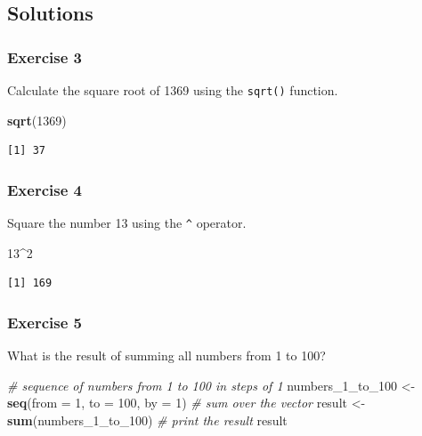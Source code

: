 \documentclass[]{article}
\newenvironment{Shaded}{\begin{snugshade}}{\end{snugshade}}
\newcommand{\KeywordTok}[1]{\textcolor[rgb]{0.13,0.29,0.53}{\textbf{#1}}}
\newcommand{\DataTypeTok}[1]{\textcolor[rgb]{0.13,0.29,0.53}{#1}}
\newcommand{\DecValTok}[1]{\textcolor[rgb]{0.00,0.00,0.81}{#1}}
\newcommand{\StringTok}[1]{\textcolor[rgb]{0.31,0.60,0.02}{#1}}
\newcommand{\CommentTok}[1]{\textcolor[rgb]{0.56,0.35,0.01}{\textit{#1}}}
\newcommand{\OperatorTok}[1]{\textcolor[rgb]{0.81,0.36,0.00}{\textbf{#1}}}
\newcommand{\NormalTok}[1]{#1}
\theoremstyle{definition}
\theoremstyle{definition}
\theoremstyle{definition}
\theoremstyle{remark}
\begin{document}
\subsection{Solutions}\label{solutions}

\subsubsection{Exercise 3}\label{exercise-3}

Calculate the square root of 1369 using the \texttt{sqrt()} function.

\begin{Shaded}
\begin{Highlighting}[]
\KeywordTok{sqrt}\NormalTok{(}\DecValTok{1369}\NormalTok{)}
\end{Highlighting}
\end{Shaded}

\begin{verbatim}
[1] 37
\end{verbatim}

\subsubsection{Exercise 4}\label{exercise-4}

Square the number 13 using the \texttt{\^{}} operator.

\begin{Shaded}
\begin{Highlighting}[]
\DecValTok{13}\OperatorTok{^}\DecValTok{2}
\end{Highlighting}
\end{Shaded}

\begin{verbatim}
[1] 169
\end{verbatim}

\subsubsection{Exercise 5}\label{exercise-5}

What is the result of summing all numbers from 1 to 100?

\begin{Shaded}
\begin{Highlighting}[]
\CommentTok{# sequence of numbers from 1 to 100 in steps of 1}
\NormalTok{numbers_1_to_}\DecValTok{100}\NormalTok{ <-}\StringTok{ }\KeywordTok{seq}\NormalTok{(}\DataTypeTok{from =} \DecValTok{1}\NormalTok{, }\DataTypeTok{to =} \DecValTok{100}\NormalTok{, }\DataTypeTok{by =} \DecValTok{1}\NormalTok{)}
\CommentTok{# sum over the vector}
\NormalTok{result <-}\StringTok{ }\KeywordTok{sum}\NormalTok{(numbers_1_to_}\DecValTok{100}\NormalTok{)}
\CommentTok{# print the result}
\NormalTok{result}
\end{Highlighting}
\end{Shaded}
\end{document}

